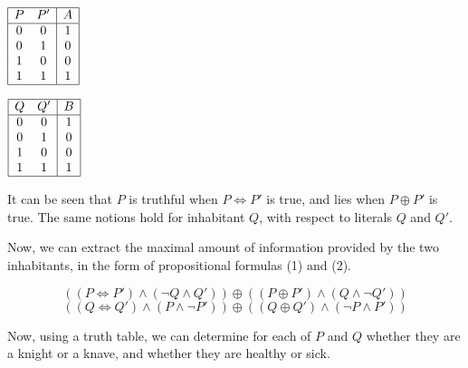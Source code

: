 \documentclass[12pt]{article}
\newcommand{\biim}{\mathbin{\Leftrightarrow}}
\begin{document}
\bigskip
\begin{minipage}{0.5\textwidth}
\begin{center}
$\begin{array}{|cc|c|}
   \hline
   P & P' & A
\\ \hline
   0 & 0 & 1
\\ 0 & 1 & 0
\\ 1 & 0 & 0
\\ 1 & 1 & 1
\\ \hline
\end{array}$
\end{center}
\end{minipage}
\begin{minipage}{0.35\textwidth}
\begin{center}
$\begin{array}{|cc|c|}
   \hline
   Q & Q' & B
\\ \hline
   0 & 0 & 1
\\ 0 & 1 & 0
\\ 1 & 0 & 0
\\ 1 & 1 & 1
\\ \hline
\end{array}$
\end{center}
\end{minipage}

\bigskip
\noindent
It can be seen that $P$ is truthful when $P \biim P'$ is true, and lies when $P 
\oplus P'$ is true. The same notions hold for inhabitant $Q$, with respect to 
literals $Q$ and $Q'$.

\bigskip
\noindent
Now, we can extract the maximal amount of information provided by the two 
inhabitants, in the form of propositional formulas (1) and (2).

\bigskip
\begin{equation}
((P \biim P') \land (\neg Q \land Q')) \oplus ((P \oplus P') \land (Q \land \neg Q'))
\end{equation}
\begin{equation}
((Q \biim Q') \land (P \land \neg P')) \oplus ((Q \oplus Q') \land (\neg P \land P'))
\end{equation}

\bigskip
\noindent
Now, using a truth table, we can determine for each of $P$ and $Q$ whether they 
are a knight or a knave, and whether they are healthy or sick.
\end{document}

